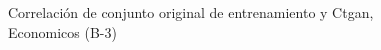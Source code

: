 \begin{figure}[H]
    \centering
    
    \caption{Correlación de conjunto original de entrenamiento y Ctgan, Economicos (B-3)}
    \label{pairwise-economicos-b-3-ctgan}
\end{figure}